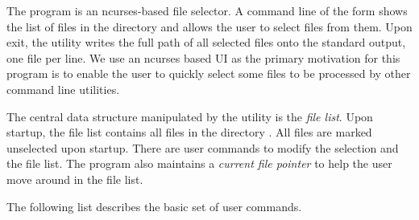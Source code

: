 The  program is an ncurses-based file selector. A command%
line of the form  shows the list of files in the
directory  and allows the user to select files from
them. Upon exit, the  utility writes the full path of all
selected files onto the standard output, one file per line.  We use an
ncurses based UI as the primary motivation for this program is to
enable the user to quickly select some files to be processed by other
command line utilities.

The central data structure manipulated by the  utility is the
\emph{file list}. Upon startup, the file list contains all files in
the directory . All files are marked unselected upon
startup. There are user commands to modify the selection and the file
list. The program also maintains a \emph{current file pointer} to help
the user move around in the file list.

The following list describes the basic set of user commands.

